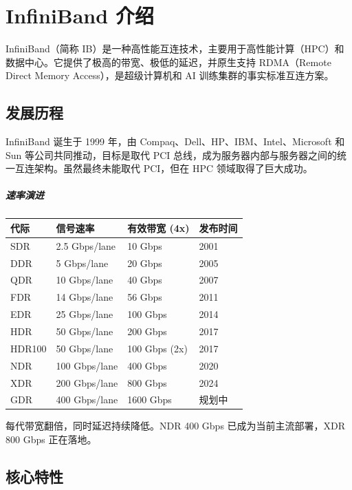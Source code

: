 \chapter{InfiniBand 介绍}

InfiniBand（简称 IB）是一种高性能互连技术，主要用于高性能计算（HPC）和数据中心。它提供了极高的带宽、极低的延迟，并原生支持 RDMA（Remote Direct Memory Access），是超级计算机和 AI 训练集群的事实标准互连方案。

\section{发展历程}

InfiniBand 诞生于 1999 年，由 Compaq、Dell、HP、IBM、Intel、Microsoft 和 Sun 等公司共同推动，目标是取代 PCI 总线，成为服务器内部与服务器之间的统一互连架构。虽然最终未能取代 PCI，但在 HPC 领域取得了巨大成功。

\paragraph{速率演进}

\begin{longtable}{llll}
\toprule
\textbf{代际} & \textbf{信号速率} & \textbf{有效带宽 (4x)} & \textbf{发布时间} \\
\midrule
\endhead
\bottomrule
\endfoot
SDR   & 2.5 Gbps/lane  & 10 Gbps   & 2001 \\
DDR   & 5 Gbps/lane    & 20 Gbps   & 2005 \\
QDR   & 10 Gbps/lane   & 40 Gbps   & 2007 \\
FDR   & 14 Gbps/lane   & 56 Gbps   & 2011 \\
EDR   & 25 Gbps/lane   & 100 Gbps  & 2014 \\
HDR   & 50 Gbps/lane   & 200 Gbps  & 2017 \\
HDR100& 50 Gbps/lane   & 100 Gbps (2x) & 2017 \\
NDR   & 100 Gbps/lane  & 400 Gbps  & 2020 \\
XDR   & 200 Gbps/lane  & 800 Gbps  & 2024 \\
GDR   & 400 Gbps/lane  & 1600 Gbps & 规划中 \\
\end{longtable}

每代带宽翻倍，同时延迟持续降低。NDR 400 Gbps 已成为当前主流部署，XDR 800 Gbps 正在落地。

\section{核心特性}

